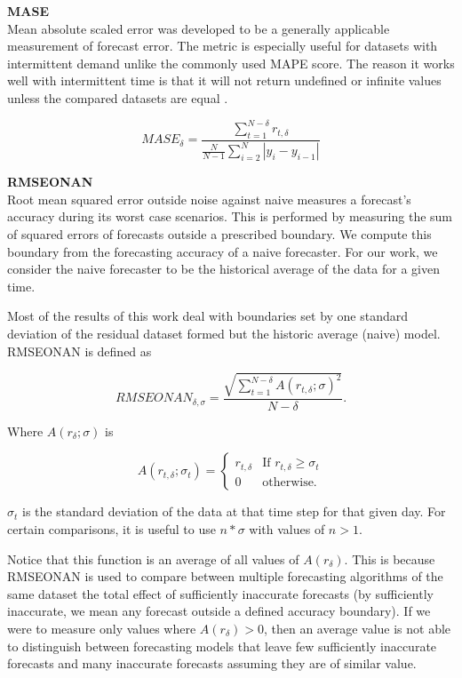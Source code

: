 \bigskip
\noindent \textbf{MASE} \\
Mean absolute scaled error was developed to be a generally applicable measurement of forecast error.  The metric is especially useful for datasets with intermittent demand unlike the commonly used MAPE score.  The reason it works well with intermittent time is that it will not return undefined or infinite values unless the compared datasets are equal \cite{Hyndman2008}.

\begin{equation}
MASE_{\delta} = \frac{\sum_{t = 1}^{N - \delta}{r_{t, \delta}}}{\frac{N}{N - 1}\sum_{i = 2}^{N}|y_{i} - y_{i - 1}|}
\end{equation}

\bigskip
\noindent \textbf{RMSEONAN} \\
Root mean squared error outside noise against naive measures a forecast's accuracy during its worst case scenarios.  This is performed by measuring the sum of squared errors of forecasts outside a prescribed boundary.  We compute this boundary from the forecasting accuracy of a naive forecaster.  For our work, we consider the naive forecaster to be the historical average of the data for a given time.  

Most of the results of this work deal with boundaries set by one standard deviation of the residual dataset formed but the historic average (naive) model.  RMSEONAN is defined as

\begin{equation}
RMSEONAN_{\delta, \sigma} = \frac{\sqrt{\sum_{t = 1}^{N - \delta}{A(r_{t, \delta}; \sigma)^{2}}}} {N - \delta}.
\end{equation}

Where $A(r_{\delta}; \sigma)$ is 

\begin{equation}
A(r_{t, \delta}; \sigma_{t}) = \begin{cases}
			r_{t, \delta}    &    \text{If }r_{t, \delta} \ge \sigma_{t} \\
			0                     &    \text{otherwise.}
			\end{cases}
\end{equation}

$\sigma_{t}$ is the standard deviation of the data at that time step for that given day.  For certain comparisons, it is useful to use $n*\sigma$ with values of $n > 1$.  

Notice that this function is an average of all values of $A(r_{\delta})$.  This is because RMSEONAN is used to compare between multiple forecasting algorithms of the same dataset the total effect of sufficiently inaccurate forecasts (by sufficiently inaccurate, we mean any forecast outside a defined  accuracy boundary).  If we were to measure only values where $A(r_{\delta}) > 0$, then an average value is not able to distinguish between forecasting models that leave few sufficiently inaccurate forecasts and many inaccurate forecasts assuming they are of similar value.  

